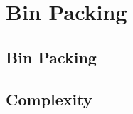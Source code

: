 \documentclass[../alevelmaths.tex]{subfiles}
\begin{document}
\chapter{Bin Packing}
\section{Bin Packing}
\section{Complexity}
\end{document}
